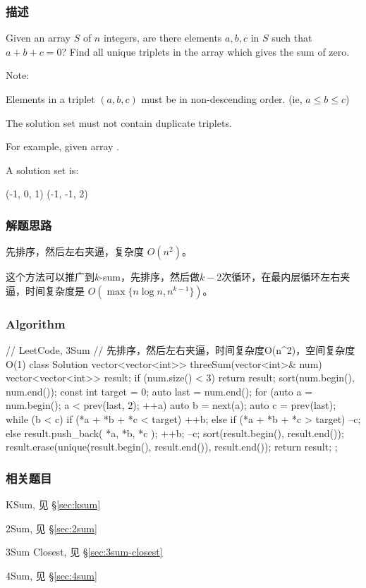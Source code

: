 \subsubsection{描述}
Given an array $S$ of $n$ integers, are there elements $a, b, c$ in $S$ such 
that $a + b + c = 0$? Find all unique triplets in the array which gives the sum 
of zero.

Note:
\begindot
\item Elements in a triplet $(a,b,c)$ must be in non-descending order. (ie, $a 
\leq b \leq c$)
\item The solution set must not contain duplicate triplets.
\myenddot

For example, given array .

A solution set is:
\begin{Code}
	(-1, 0, 1)
	(-1, -1, 2)
\end{Code}


\subsubsection{解题思路}
先排序，然后左右夹逼，复杂度 $O(n^2)$。

这个方法可以推广到$k$-sum，先排序，然后做$k-2$次循环，在最内层循环左右夹逼，时间复杂度是 
$O(\max\{n \log n, n^{k-1}\})$。


\subsubsection{Algorithm}
\begin{Code}
	// LeetCode, 3Sum
	// 先排序，然后左右夹逼，时间复杂度O(n^2)，空间复杂度O(1)
	class Solution {
		vector<vector<int>> threeSum(vector<int>& num) {
			vector<vector<int>> result;
			if (num.size() < 3) return result;
			sort(num.begin(), num.end());
			const int target = 0;
			auto last = num.end();
			for (auto a = num.begin(); a < prev(last, 2); ++a) {
				auto b = next(a);
				auto c = prev(last);
				while (b < c) {
					if (*a + *b + *c < target) {
						++b;
					} else if (*a + *b + *c > target) {
						--c;
					} else {
						result.push_back({ *a, *b, *c });
						++b;
						--c;
					}
				}
			}
			sort(result.begin(), result.end());
			result.erase(unique(result.begin(), result.end()), result.end());
			return result;
		}
	};
\end{Code}


\subsubsection{相关题目}
\begindot
\item KSum, 见 \S \ref{sec:ksum}
\item 2Sum, 见 \S \ref{sec:2sum}
\item 3Sum Closest, 见 \S \ref{sec:3sum-closest}
\item 4Sum, 见 \S \ref{sec:4sum}
\myenddot


